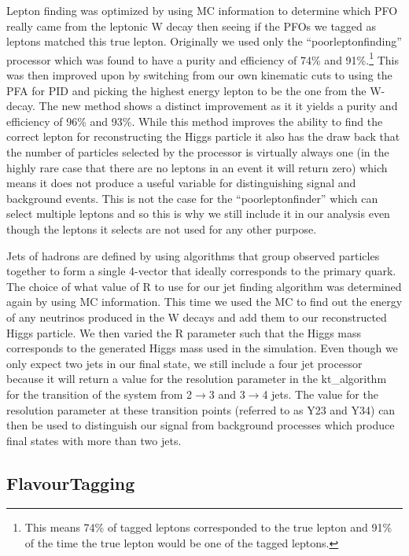 Lepton finding was optimized by using \ac{MC} information to determine which PFO really came from the leptonic W decay then seeing if the PFOs we tagged as leptons matched this true lepton. Originally we used only the ``poorleptonfinding'' processor which was found to have a purity and efficiency of 74\% and 91\%.\footnote{This means 74\% of tagged leptons corresponded to the true lepton and 91\% of the time the true lepton would be one of the tagged leptons.} This was then improved upon by switching from our own kinematic cuts to using the \ac{PFA} for PID and picking the highest energy lepton to be the one from the W-decay. The new method shows a distinct improvement as it it yields a purity and efficiency of 96\% and 93\%. While this method improves the ability to find the correct lepton for reconstructing the Higgs particle it also has the draw back that the number of particles selected by the processor is virtually always one (in the highly rare case that there are no leptons in an event it will return zero) which means it does not produce a useful variable for distinguishing signal and background events. This is not the case for the ``poorleptonfinder'' which can select multiple leptons and so this is why we still include it in our analysis even though the leptons it selects are not used for any other purpose.

Jets of hadrons are defined by using algorithms that group observed particles together to form a single 4-vector that ideally corresponds to the primary quark. The choice of what value of R to use for our jet finding algorithm was determined again by using \ac{MC} information. This time we used the \ac{MC} to find out the energy of any neutrinos produced in the W decays and add them to our reconstructed Higgs particle. We then varied the R parameter such that the Higgs mass corresponds to the generated Higgs mass used in the simulation. Even though we only expect two jets in our final state, we still include a four jet processor because it will return a value for the resolution parameter in the kt\_algorithm for the transition of the system from 2${\rightarrow}$3 and 3$\rightarrow$4 jets. The value for the resolution parameter at these transition points (referred to as Y23 and Y34) can then be used to distinguish our signal from background processes which produce final states with more than two jets.

\subsection{FlavourTagging}

